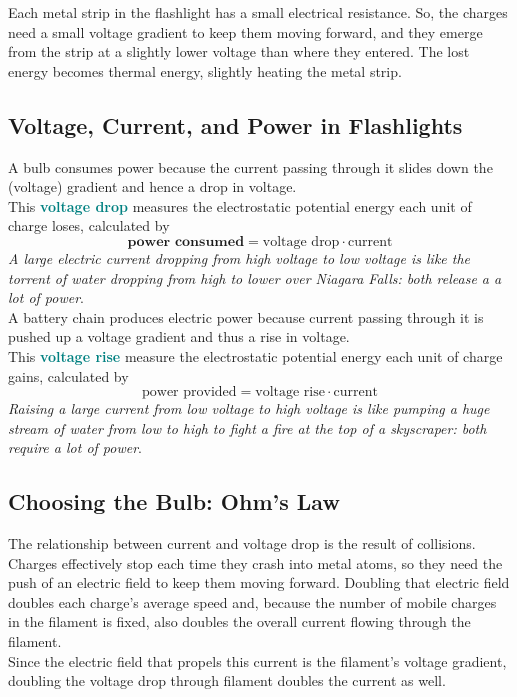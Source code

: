 \documentclass[12pt]{article}
\theoremstyle{definition}
\newcommand{\defnterm}[1]{\textbf{\textcolor{teal}{#1}}\index{#1}}
\begin{document}
Each metal strip in the flashlight has a small electrical resistance.
So, the charges need a small voltage gradient to keep them moving forward, and they emerge from the strip at a slightly lower voltage than where they entered.
The lost energy becomes thermal energy, slightly heating the metal strip.

\subsection{Voltage, Current, and Power in Flashlights}
A bulb consumes power because the current passing through it slides down the (voltage) gradient and hence a drop in voltage. \\
This \defnterm{voltage drop} measures the electrostatic potential energy each unit of charge loses, calculated by
$$\textbf{power consumed} = \text{voltage drop} \cdot \text{current}$$
\emph{A large electric current dropping from high voltage to low voltage is like the torrent of water dropping from high to lower over Niagara Falls: both release a a lot of power}. \\

A battery chain produces electric power because current passing through it is pushed up a voltage gradient and thus a rise in voltage. \\
This \defnterm{voltage rise} measure the electrostatic potential energy each unit of charge gains, calculated by
$$\text{power provided} = \text{voltage rise} \cdot \text{current}$$
\emph{Raising a large current from low voltage to high voltage is like pumping a huge stream of water from low to high to fight a fire at the top of a skyscraper: both require a lot of power}.

\subsection{Choosing the Bulb: Ohm's Law}
The relationship between current and voltage drop is the result of collisions. \\
Charges effectively stop each time they crash into metal atoms, so they need the push of an electric field to keep them moving forward.
Doubling that electric field doubles each charge's average speed and, because the number of mobile charges in the filament is fixed, also doubles the overall current flowing through the filament. \\
Since the electric field that propels this current is the filament's voltage gradient, doubling the voltage drop through filament doubles the current as well. \\
\end{document}
